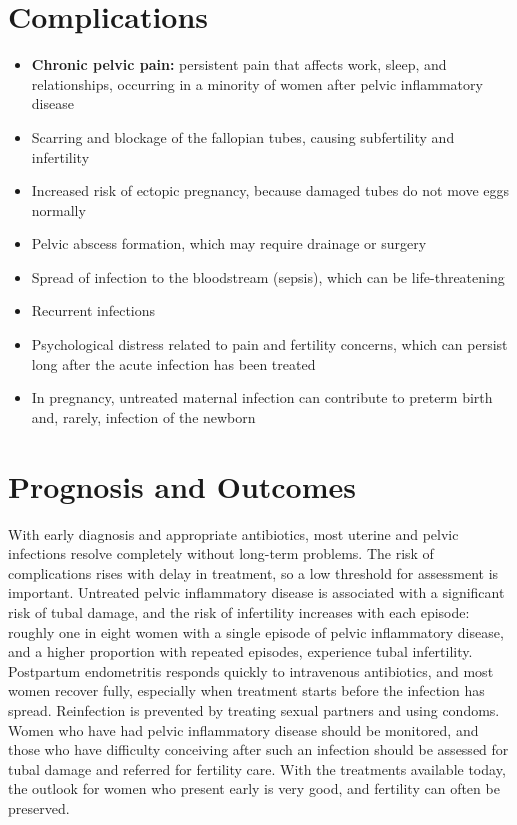\section*{Complications}
\begin{itemize}
    \item \textbf{Chronic pelvic pain:} persistent pain that affects work, sleep, and relationships, occurring in a minority of women after pelvic inflammatory disease
    \item Scarring and blockage of the fallopian tubes, causing subfertility and infertility
    \item Increased risk of ectopic pregnancy, because damaged tubes do not move eggs normally
    \item Pelvic abscess formation, which may require drainage or surgery
    \item Spread of infection to the bloodstream (sepsis), which can be life-threatening
    \item Recurrent infections
    \item Psychological distress related to pain and fertility concerns, which can persist long after the acute infection has been treated
    \item In pregnancy, untreated maternal infection can contribute to preterm birth and, rarely, infection of the newborn
\end{itemize}

\section*{Prognosis and Outcomes}
With early diagnosis and appropriate antibiotics, most uterine and pelvic infections resolve completely without long-term problems. The risk of complications rises with delay in treatment, so a low threshold for assessment is important. Untreated pelvic inflammatory disease is associated with a significant risk of tubal damage, and the risk of infertility increases with each episode: roughly one in eight women with a single episode of pelvic inflammatory disease, and a higher proportion with repeated episodes, experience tubal infertility. Postpartum endometritis responds quickly to intravenous antibiotics, and most women recover fully, especially when treatment starts before the infection has spread. Reinfection is prevented by treating sexual partners and using condoms. Women who have had pelvic inflammatory disease should be monitored, and those who have difficulty conceiving after such an infection should be assessed for tubal damage and referred for fertility care. With the treatments available today, the outlook for women who present early is very good, and fertility can often be preserved.

